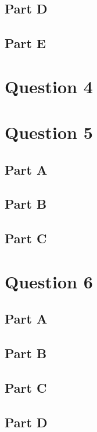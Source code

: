 \documentclass[letterpaper]{article}
\begin{document}
\subsection*{Part D}

\subsection*{Part E}

\newpage

\section*{Question 4}

\newpage

\section*{Question 5}

\subsection*{Part A}

\subsection*{Part B}

\subsection*{Part C}

\newpage

\section*{Question 6}

\subsection*{Part A}

\subsection*{Part B}

\subsection*{Part C}

\subsection*{Part D}
\end{document}
